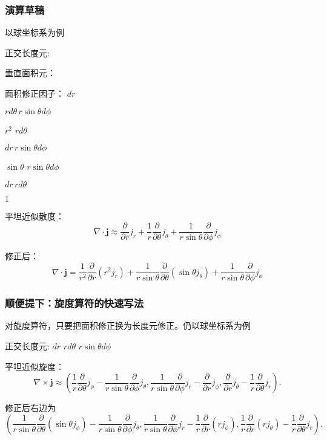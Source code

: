 \documentclass[CJK]{beamer}
\begin{document}
\begin{frame}
  \frametitle{演算草稿}
  
  以球坐标系为例

  \skiplines

  正交长度元:
  
  垂直面积元：
  
  面积修正因子：
  \emini
  $dr$
  
  $rd\theta\, r\sin\theta d\phi$
  
  $r^2$
  \emini
  $rd\theta$
  
  $dr\, r\sin\theta d\phi$
  
  $\sin\theta$
  \emini
  $r\sin\theta d\phi$
  
  $dr\, rd\theta$
  
  $1$
  \emini

  \skipline
  
  平坦近似散度：
  $$\nabla\cdot \mathbf{j} \approx \frac{\partial}{\partial r} j_r + \frac{1}{r} \frac{\partial}{\partial \theta} j_\theta + \frac{1}{r\sin\theta}\frac{\partial}{\partial \phi} j_\phi $$

  修正后：
  $$\nabla\cdot \mathbf{j} =\frac{1}{r^2} \frac{\partial}{\partial r} (r^2j_r) + \frac{1}{r\sin\theta} \frac{\partial}{\partial \theta} (\sin\theta j_\theta) + \frac{1}{r\sin\theta}\frac{\partial}{\partial \phi} j_\phi $$
  
  
\end{frame}

\begin{frame}
  \frametitle{顺便提下：旋度算符的快速写法}
  
  对旋度算符，只要把面积修正换为长度元修正。仍以球坐标系为例

  \skiplines

  正交长度元:
  \emini
  $dr$
  \emini
  $rd\theta$
  \emini
  $r\sin\theta d\phi$
  \emini

  
  \skipline
  
  平坦近似旋度：
  $$\nabla\times \mathbf{j} \approx \left( \frac{1}{r}\frac{\partial}{\partial \theta} j_\phi -  \frac{1}{r\sin\theta}\frac{\partial}{\partial \phi} j_\theta ,  \frac{1}{r\sin\theta}\frac{\partial}{\partial \phi} j_r -  \frac{\partial}{\partial r} j_\phi, \frac{\partial}{\partial r} j_\theta-  \frac{1}{r}\frac{\partial}{\partial \theta} j_r\right). $$

  修正后右边为{\small 
  $$\left( \frac{1}{r\sin\theta}\frac{\partial}{\partial \theta} (\sin\theta j_\phi) -  \frac{1}{r\sin\theta}\frac{\partial}{\partial \phi} j_\theta ,  \frac{1}{r\sin\theta}\frac{\partial}{\partial \phi} j_r - \frac{1}{r} \frac{\partial}{\partial r} (rj_\phi), \frac{1}{r}\frac{\partial}{\partial r} (rj_\theta)-  \frac{1}{r}\frac{\partial}{\partial \theta} j_r\right). $$}
  
  
\end{frame}
\end{document}
